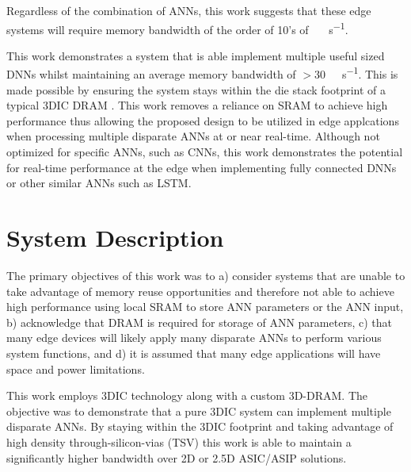 \documentclass[journal]{IEEEtran}
\begin{document}
Regardless of the combination of ANNs, this work suggests that these edge systems will require memory bandwidth of the order of 10's of \SI[per-mode=symbol]{}{\tera \bit \per \second}.

This work demonstrates a system that is able implement multiple useful sized DNNs whilst maintaining an average memory bandwidth of $>$\SI[per-mode=symbol]{30}{\tera \bit \per \second}.
This is made possible by ensuring the system stays within the die stack footprint of a typical 3DIC DRAM .
This work removes a reliance on SRAM to achieve high performance thus allowing the proposed design to be utilized in edge applcations when processing multiple disparate ANNs at or near real-time.
Although not optimized for specific ANNs, such as CNNs, this work demonstrates the potential for real-time performance at the edge when implementing fully connected DNNs or other similar ANNs such as LSTM.


\section{System Description}
\label{System Description}


The primary objectives of this work was to a) consider systems that are unable to take advantage of memory reuse opportunities and therefore not able to achieve high performance using
local SRAM to store ANN parameters or the ANN input, b) acknowledge that DRAM is required for storage of ANN parameters, c) that many edge devices will likely apply many disparate ANNs
to perform various system functions, and d) it is assumed that many edge applications will have space and power limitations.

This work employs 3DIC technology along with a custom 3D-DRAM. The objective was to demonstrate that a pure 3DIC system can implement multiple disparate ANNs. By staying within the 3DIC footprint and taking advantage of high
density through-silicon-vias (TSV) this work is able to maintain a significantly higher bandwidth over 2D or 2.5D ASIC/ASIP solutions.
\end{document}
